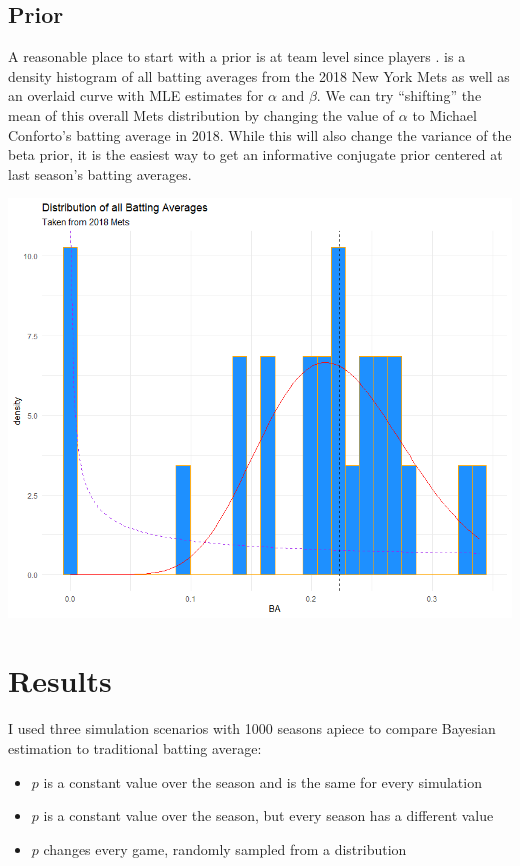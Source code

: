 \documentclass[10pt,a4paper]{article}
\begin{document}
\subsection{Prior}

A reasonable place to start with a prior is at team level since players .
 is a density histogram of all batting averages from the 2018 New York Mets\cite{lahman} as well as an overlaid curve with MLE estimates for $\alpha$ and $\beta$.
We can try ``shifting'' the mean of this overall Mets distribution by changing the value of $\alpha$ to Michael Conforto's batting average in 2018.
While this will also change the variance of the beta prior, it is the easiest way to get an informative conjugate prior centered at last season's batting averages.

\begin{center}
	\includegraphics[width=.5\textwidth]{2018_mets_prior}
\end{center}

\section{Results}

I used three simulation scenarios with 1000 seasons apiece to compare Bayesian estimation to traditional batting average:
\begin{itemize}
	\item $p$ is a constant value over the season and is the same for every simulation
	\item $p$ is a constant value over the season, but every season has a different value
	\item $p$ changes every game, randomly sampled from a distribution
\end{itemize}
\end{document}
